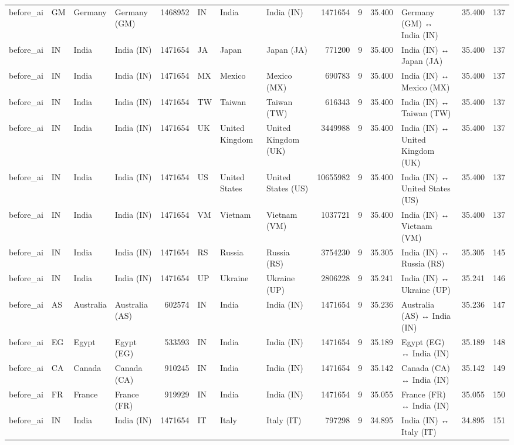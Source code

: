 \begin{tabular}{llllrlllrrrlrr}
before\_ai & GM & Germany & Germany (GM) & 1468952 & IN & India & India (IN) & 1471654 & 9 & 35.400 & Germany (GM) ↔ India (IN) & 35.400 & 137 \\
before\_ai & IN & India & India (IN) & 1471654 & JA & Japan & Japan (JA) & 771200 & 9 & 35.400 & India (IN) ↔ Japan (JA) & 35.400 & 137 \\
before\_ai & IN & India & India (IN) & 1471654 & MX & Mexico & Mexico (MX) & 690783 & 9 & 35.400 & India (IN) ↔ Mexico (MX) & 35.400 & 137 \\
before\_ai & IN & India & India (IN) & 1471654 & TW & Taiwan & Taiwan (TW) & 616343 & 9 & 35.400 & India (IN) ↔ Taiwan (TW) & 35.400 & 137 \\
before\_ai & IN & India & India (IN) & 1471654 & UK & United Kingdom & United Kingdom (UK) & 3449988 & 9 & 35.400 & India (IN) ↔ United Kingdom (UK) & 35.400 & 137 \\
before\_ai & IN & India & India (IN) & 1471654 & US & United States & United States (US) & 10655982 & 9 & 35.400 & India (IN) ↔ United States (US) & 35.400 & 137 \\
before\_ai & IN & India & India (IN) & 1471654 & VM & Vietnam & Vietnam (VM) & 1037721 & 9 & 35.400 & India (IN) ↔ Vietnam (VM) & 35.400 & 137 \\
before\_ai & IN & India & India (IN) & 1471654 & RS & Russia & Russia (RS) & 3754230 & 9 & 35.305 & India (IN) ↔ Russia (RS) & 35.305 & 145 \\
before\_ai & IN & India & India (IN) & 1471654 & UP & Ukraine & Ukraine (UP) & 2806228 & 9 & 35.241 & India (IN) ↔ Ukraine (UP) & 35.241 & 146 \\
before\_ai & AS & Australia & Australia (AS) & 602574 & IN & India & India (IN) & 1471654 & 9 & 35.236 & Australia (AS) ↔ India (IN) & 35.236 & 147 \\
before\_ai & EG & Egypt & Egypt (EG) & 533593 & IN & India & India (IN) & 1471654 & 9 & 35.189 & Egypt (EG) ↔ India (IN) & 35.189 & 148 \\
before\_ai & CA & Canada & Canada (CA) & 910245 & IN & India & India (IN) & 1471654 & 9 & 35.142 & Canada (CA) ↔ India (IN) & 35.142 & 149 \\
before\_ai & FR & France & France (FR) & 919929 & IN & India & India (IN) & 1471654 & 9 & 35.055 & France (FR) ↔ India (IN) & 35.055 & 150 \\
before\_ai & IN & India & India (IN) & 1471654 & IT & Italy & Italy (IT) & 797298 & 9 & 34.895 & India (IN) ↔ Italy (IT) & 34.895 & 151 \\

\end{tabular}
